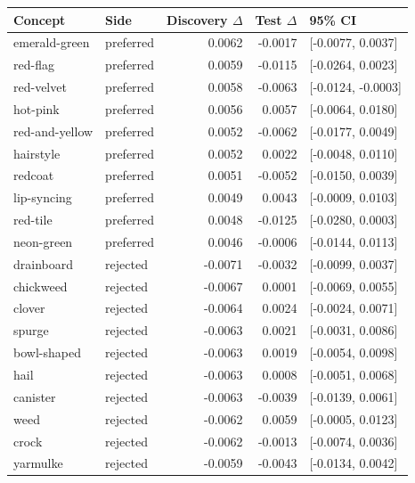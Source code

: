 \begin{tabular}{llrrl}
\toprule
Concept & Side & Discovery $\Delta$ & Test $\Delta$ & 95\% CI \\
\midrule
emerald-green & preferred & 0.0062 & -0.0017 & [-0.0077, 0.0037] \\
red-flag & preferred & 0.0059 & -0.0115 & [-0.0264, 0.0023] \\
red-velvet & preferred & 0.0058 & -0.0063 & [-0.0124, -0.0003] \\
hot-pink & preferred & 0.0056 & 0.0057 & [-0.0064, 0.0180] \\
red-and-yellow & preferred & 0.0052 & -0.0062 & [-0.0177, 0.0049] \\
hairstyle & preferred & 0.0052 & 0.0022 & [-0.0048, 0.0110] \\
redcoat & preferred & 0.0051 & -0.0052 & [-0.0150, 0.0039] \\
lip-syncing & preferred & 0.0049 & 0.0043 & [-0.0009, 0.0103] \\
red-tile & preferred & 0.0048 & -0.0125 & [-0.0280, 0.0003] \\
neon-green & preferred & 0.0046 & -0.0006 & [-0.0144, 0.0113] \\
drainboard & rejected & -0.0071 & -0.0032 & [-0.0099, 0.0037] \\
chickweed & rejected & -0.0067 & 0.0001 & [-0.0069, 0.0055] \\
clover & rejected & -0.0064 & 0.0024 & [-0.0024, 0.0071] \\
spurge & rejected & -0.0063 & 0.0021 & [-0.0031, 0.0086] \\
bowl-shaped & rejected & -0.0063 & 0.0019 & [-0.0054, 0.0098] \\
hail & rejected & -0.0063 & 0.0008 & [-0.0051, 0.0068] \\
canister & rejected & -0.0063 & -0.0039 & [-0.0139, 0.0061] \\
weed & rejected & -0.0062 & 0.0059 & [-0.0005, 0.0123] \\
crock & rejected & -0.0062 & -0.0013 & [-0.0074, 0.0036] \\
yarmulke & rejected & -0.0059 & -0.0043 & [-0.0134, 0.0042] \\
\bottomrule
\end{tabular}
